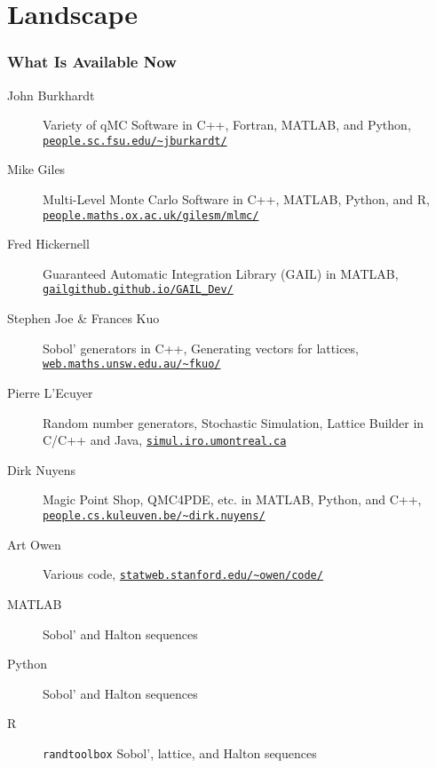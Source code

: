 \documentclass[11pt,compress,xcolor={usenames,dvipsnames},aspectratio=169]{beamer}
\begin{document}
\section{Landscape}

\begin{frame}
\frametitle{What Is Available Now}

\vspace{-4ex}
\begin{description}

\item[John Burkhardt] Variety of qMC Software in C++, Fortran, MATLAB, and Python, \href{http://people.sc.fsu.edu/~jburkardt/}{\nolinkurl{people.sc.fsu.edu/~jburkardt/}}


\item[Mike Giles] Multi-Level Monte Carlo Software in C++, MATLAB, Python, and R, \href{https://people.maths.ox.ac.uk/gilesm/mlmc/}{\nolinkurl{people.maths.ox.ac.uk/gilesm/mlmc/}}

\item[Fred Hickernell] Guaranteed Automatic Integration Library (GAIL) in MATLAB,
\href{http://gailgithub.github.io/GAIL_Dev/}{\nolinkurl{gailgithub.github.io/GAIL_Dev/}}


\item[Stephen Joe \& Frances Kuo] Sobol' generators in C++, Generating vectors for lattices, 
\href{http://web.maths.unsw.edu.au/~fkuo/}{\nolinkurl{web.maths.unsw.edu.au/~fkuo/}}

\item[Pierre L'Ecuyer] Random number generators, Stochastic Simulation, Lattice Builder in C/C++ and Java,
\href{http://simul.iro.umontreal.ca}{\nolinkurl{simul.iro.umontreal.ca}}

\item[Dirk Nuyens] Magic Point Shop, QMC4PDE, etc. in MATLAB, Python, and C++,
\href{https://people.cs.kuleuven.be/~dirk.nuyens/}{\nolinkurl{people.cs.kuleuven.be/~dirk.nuyens/}}


\item[Art Owen] Various code,
\href{http://statweb.stanford.edu/~owen/code/}{\nolinkurl{statweb.stanford.edu/~owen/code/}}

\item[MATLAB] Sobol' and Halton sequences

\item[Python] Sobol' and Halton sequences

\item[R] \texttt{randtoolbox} Sobol', lattice, and Halton sequences

\end{description}
\end{frame}
\end{document}
